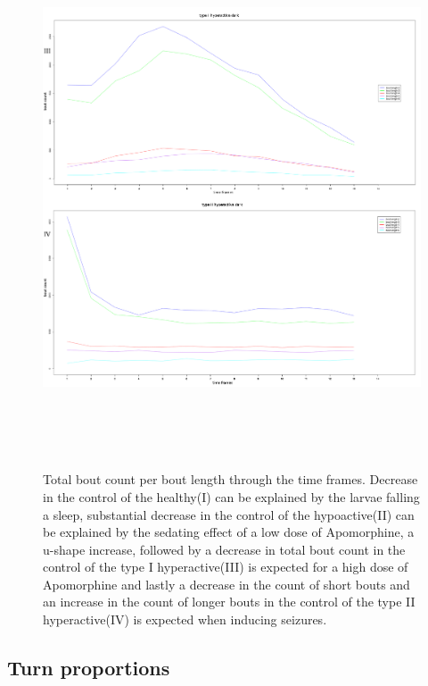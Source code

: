 \begin{figure}[h!]
\begin{center}
\includegraphics[width=15cm,height=16cm]{countChangeTime2.png}
\caption{Total bout count per bout length through the time frames. Decrease in the control of the healthy(I) can be explained by the larvae falling a sleep, substantial decrease in the control of the hypoactive(II) can be explained by the sedating effect of a low dose of Apomorphine, a u-shape increase, followed by a decrease in total bout count in the control of the type I hyperactive(III) is expected for a high dose of Apomorphine\cite{ref17} and lastly a decrease in the count of short bouts and an increase in the count of longer bouts in the control of the type II hyperactive(IV) is expected when inducing seizures\cite{ref14}.}
\end{center}
\end{figure}


\subsection{Turn proportions}

